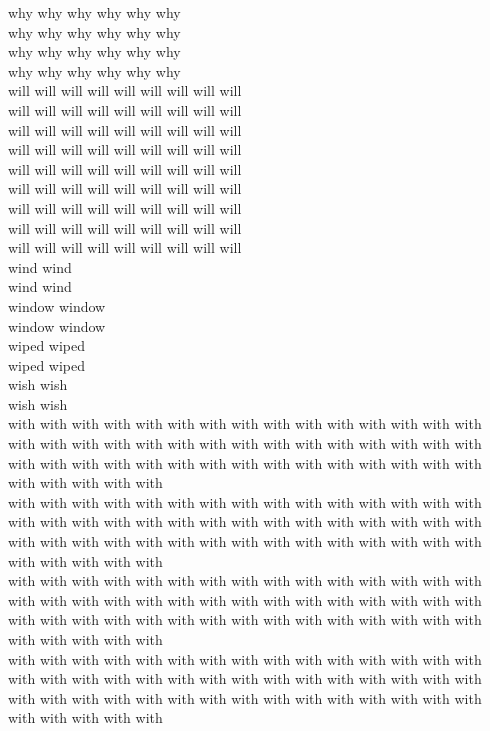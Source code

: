 why why why why why why\\
why why why why why why\\
why why why why why why\\
why why why why why why\\
will will will will will will will will will\\
will will will will will will will will will\\
will will will will will will will will will\\
will will will will will will will will will\\
will will will will will will will will will\\
will will will will will will will will will\\
will will will will will will will will will\\
will will will will will will will will will\\
will will will will will will will will will\\
wind wind\\
wind wind\\
window window\\
window window\\
wiped wiped\\
wiped wiped\\
wish wish\\
wish wish\\
with with with with with with with with with with with with with with with with with with with with with with with with with with with with with with with with with with with with with with with with with with with with with with with with with with\\
with with with with with with with with with with with with with with with with with with with with with with with with with with with with with with with with with with with with with with with with with with with with with with with with with with\\
with with with with with with with with with with with with with with with with with with with with with with with with with with with with with with with with with with with with with with with with with with with with with with with with with with\\
with with with with with with with with with with with with with with with with with with with with with with with with with with with with with with with with with with with with with with with with with with with with with with with with with with\\
